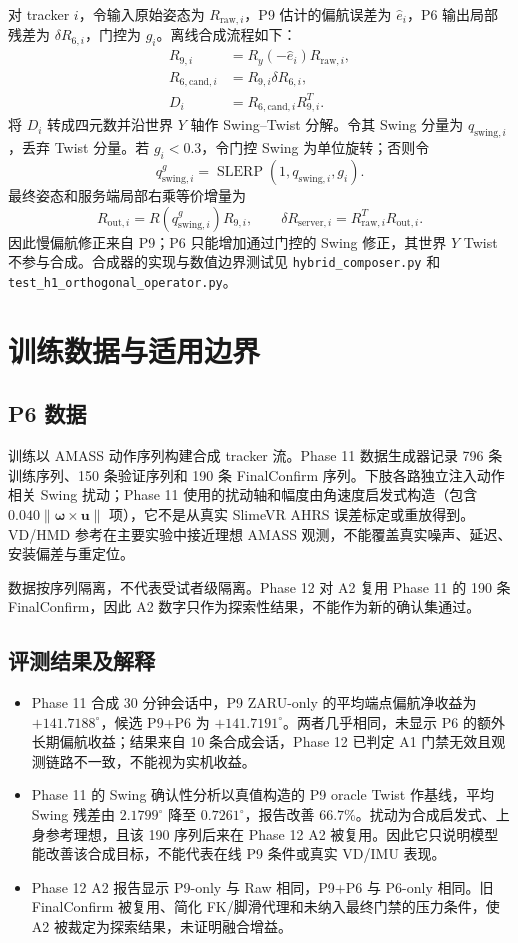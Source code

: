 \documentclass[UTF8,11pt,a4paper]{ctexart}
\begin{document}
对 tracker \(i\)，令输入原始姿态为 \(R_{\mathrm{raw},i}\)，P9 估计的偏航误差为 \(\hat e_i\)，P6 输出局部残差为 \(\delta R_{6,i}\)，门控为 \(g_i\)。离线合成流程如下：
\begin{align}
R_{9,i} &= R_y(-\hat e_i)R_{\mathrm{raw},i},\\
R_{6,\mathrm{cand},i} &= R_{9,i}\delta R_{6,i},\\
D_i &= R_{6,\mathrm{cand},i}R_{9,i}^{T}.
\end{align}
将 \(D_i\) 转成四元数并沿世界 \(Y\) 轴作 Swing--Twist 分解。令其 Swing 分量为 \(q_{\mathrm{swing},i}\)，丢弃 Twist 分量。若 \(g_i<0.3\)，令门控 Swing 为单位旋转；否则令
\[
q_{\mathrm{swing},i}^{g}
=\operatorname{SLERP}(1,q_{\mathrm{swing},i},g_i).
\]
最终姿态和服务端局部右乘等价增量为
\[
R_{\mathrm{out},i}=R(q_{\mathrm{swing},i}^{g})R_{9,i},
\qquad
\delta R_{\mathrm{server},i}=R_{\mathrm{raw},i}^{T}R_{\mathrm{out},i}.
\]
因此慢偏航修正来自 P9；P6 只能增加通过门控的 Swing 修正，其世界 \(Y\) Twist 不参与合成。合成器的实现与数值边界测试见 \texttt{hybrid\_composer.py} 和 \texttt{test\_h1\_orthogonal\_operator.py}。

\section{训练数据与适用边界}

\subsection{P6 数据}
训练以 AMASS 动作序列构建合成 tracker 流。Phase 11 数据生成器记录 796 条训练序列、150 条验证序列和 190 条 FinalConfirm 序列。下肢各路独立注入动作相关 Swing 扰动；Phase 11 使用的扰动轴和幅度由角速度启发式构造（包含 \(0.040\|\boldsymbol{\omega}\times\mathbf{u}\|\) 项），它不是从真实 SlimeVR AHRS 误差标定或重放得到。VD/HMD 参考在主要实验中接近理想 AMASS 观测，不能覆盖真实噪声、延迟、安装偏差与重定位。

数据按序列隔离，不代表受试者级隔离。Phase 12 对 A2 复用 Phase 11 的 190 条 FinalConfirm，因此 A2 数字只作为探索性结果，不能作为新的确认集通过。

\subsection{评测结果及解释}
\begin{itemize}
  \item Phase 11 合成 30 分钟会话中，P9 ZARU-only 的平均端点偏航净收益为 \(+141.7188^\circ\)，候选 P9+P6 为 \(+141.7191^\circ\)。两者几乎相同，未显示 P6 的额外长期偏航收益；结果来自 10 条合成会话，Phase 12 已判定 A1 门禁无效且观测链路不一致，不能视为实机收益。
  \item Phase 11 的 Swing 确认性分析以真值构造的 P9 oracle Twist 作基线，平均 Swing 残差由 \(2.1799^\circ\) 降至 \(0.7261^\circ\)，报告改善 \(66.7\%\)。扰动为合成启发式、上身参考理想，且该 190 序列后来在 Phase 12 A2 被复用。因此它只说明模型能改善该合成目标，不能代表在线 P9 条件或真实 VD/IMU 表现。
  \item Phase 12 A2 报告显示 P9-only 与 Raw 相同，P9+P6 与 P6-only 相同。旧 FinalConfirm 被复用、简化 FK/脚滑代理和未纳入最终门禁的压力条件，使 A2 被裁定为探索结果，未证明融合增益。
\end{itemize}
\end{document}
